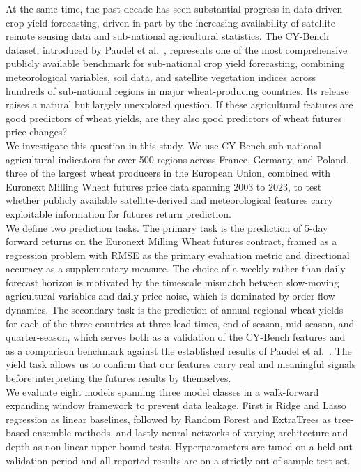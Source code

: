 \documentclass[pdflatex,sn-mathphys-num, oneside, 11pt]{sn-jnl}%
\theoremstyle{thmstyleone}%
\theoremstyle{thmstyletwo}%
\theoremstyle{thmstylethree}%
\begin{document}
At the same time, the past decade has seen substantial progress in data-driven crop yield forecasting, driven in part by the increasing availability of satellite remote sensing data and sub-national agricultural statistics. The CY-Bench dataset, introduced by Paudel et al.~\cite{bib17}, represents one of the most comprehensive publicly available benchmark for sub-national crop yield forecasting, combining meteorological variables, soil data, and satellite vegetation indices across hundreds of sub-national regions in major wheat-producing countries. Its release raises a natural but largely unexplored question. If these agricultural features are good predictors of wheat yields, are they also good predictors of wheat futures price changes?\\

We investigate this question in this study. We use CY-Bench sub-national agricultural indicators for over 500 regions across France, Germany, and Poland, three of the largest wheat producers in the European Union, combined with Euronext Milling Wheat futures price data spanning 2003 to 2023, to test whether publicly available satellite-derived and meteorological features carry exploitable information for futures return prediction.\\

We define two prediction tasks. The primary task is the prediction of 5-day forward returns on the Euronext Milling Wheat futures contract, framed as a regression problem with RMSE as the primary evaluation metric and directional accuracy as a supplementary measure. The choice of a weekly rather than daily forecast horizon is motivated by the timescale mismatch between slow-moving agricultural variables and daily price noise, which is dominated by order-flow dynamics. The secondary task is the prediction of annual regional wheat yields for each of the three countries at three lead times, end-of-season, mid-season, and quarter-season, which serves both as a validation of the CY-Bench features and as a comparison benchmark against the established results of Paudel et al.~\cite{bib16,bib17}. The yield task allows us to confirm that our features carry real and meaningful signals before interpreting the futures results by themselves.\\

We evaluate eight models spanning three model classes in a walk-forward expanding window framework to prevent data leakage. First is Ridge and Lasso regression as linear baselines, followed by Random Forest and ExtraTrees as tree-based ensemble methods, and lastly neural networks of varying architecture and depth as non-linear upper bound tests. Hyperparameters are tuned on a held-out validation period and all reported results are on a strictly out-of-sample test set.\\
\end{document}
